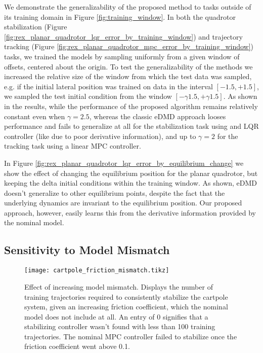 \documentclass{article}
\begin{document}
We demonstrate the generalizability of the proposed method to tasks outside of its training
domain in Figure \ref{fig:training_window}. In both the quadrotor 
stabilization (Figure \ref{fig:rex_planar_quadrotor_lqr_error_by_training_window}) and 
trajectory tracking (Figure \ref{fig:rex_planar_quadrotor_mpc_error_by_training_window})
tasks, we trained the models by sampling uniformly from a given window of offsets, centered 
about the origin. 
To test the generalizability of the methods we increased the relative size of the window 
from which the test data was sampled, e.g. if the initial lateral position was trained on 
data in the interval $[-1.5,+1.5]$, we sampled the test initial condition from the window 
$[-\gamma 1.5, +\gamma 1.5]$. As shown in the results, while the performance of the proposed
algorithm remains relatively constant even when $\gamma = 2.5$, whereas the classic eDMD 
approach looses performance and fails to generalize at all for the stabilization task using 
and LQR controller (like due to poor derivative information), and up to $\gamma = 2$ for the 
tracking task using a linear MPC controller.

In Figure \ref{fig:rex_planar_quadrotor_lqr_error_by_equilibrium_change} we show the effect 
of changing the equilibrium position for the planar quadrotor, but keeping the delta initial
conditions within the training window. As shown, eDMD doesn't generalize to other
equilibrium points, despite the fact that the underlying dynamics are invariant to the
equilibrium position. Our proposed approach, however, easily learns this from the derivative
information provided by the nominal model.

\subsection{Sensitivity to Model Mismatch}
\begin{figure}
  \centering
  \texttt{[image: cartpole\_friction\_mismatch.tikz]}
  \caption{Effect of increasing model mismatch. Displays the number of training trajectories
  required to consistently stabilize the cartpole system, given an increasing friction 
  coefficient, which the nominal model does not include at all. An entry of 0 signifies 
  that a stabilizing controller wasn't found with less than 100 training trajectories.
  The nominal MPC controller failed to stabilize once the friction coefficient went above 
  0.1.
  }
  \label{fig:cartpole_friction_mismatch}
\end{figure}
\end{document}

